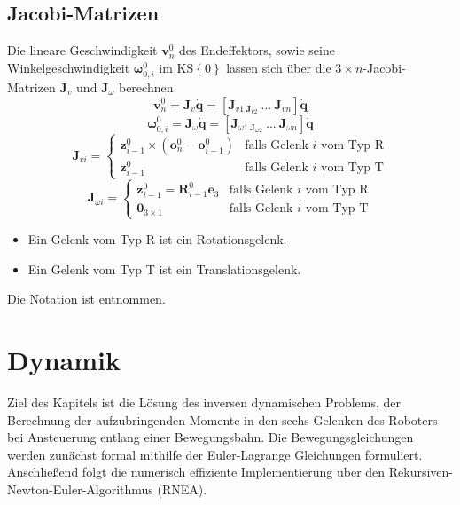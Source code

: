 \subsection{Jacobi-Matrizen}
Die lineare Geschwindigkeit $\bm{v}^0_n$ des Endeffektors, sowie seine Winkelgeschwindigkeit $\bm{\omega}^0_{0,i}$ im  KS$\left\{0\right\}$ lassen sich über die $3\times n$-Jacobi-Matrizen $\bm{J}_v$ und $\bm{J}_{\omega}$ berechnen. 
%
\begin{equation}
	\bm{v}^0_n = \bm{J}_v \dot{\bm{q}} = \left[\bm{J}_{v1 \ \bm{J}_{v2}} \ ...\  \bm{J}_{vn}\right] \dot{\bm{q}}
\end{equation}
%
\begin{equation}
	\bm{\omega}^0_{0,i} = \bm{J}_{\omega} \dot{\bm{q}}  = \left[\bm{J}_{\omega1 \ \bm{J}_{\omega2}} \ ...\  \bm{J}_{\omega n}\right] \dot{\bm{q}}
\end{equation}
%
\begin{equation}
	\bm{J}_{vi} = \begin{cases} 
		\bm{z}^0_{i-1} \times (\bm{o}^0_{n} - \bm{o}^0_{i-1}) & \text{falls Gelenk } i \text{ vom Typ } \text{R} \\
		\bm{z}^0_{i-1} & \text{falls Gelenk } i \text{ vom Typ } \text{T}
	\end{cases}
\end{equation}
%
\begin{equation}
	\bm{J}_{\omega i} = \begin{cases} 
		\bm{z}^0_{i-1} = \bm{R}^0_{i-1}\bm{e}_3 & \text{falls Gelenk } i \text{ vom Typ } \text{R} \\
		\mathbf{0}_{3 \times 1} & \text{falls Gelenk } i \text{ vom Typ } \text{T}
	\end{cases}
\end{equation}
%
\begin{itemize}
	\item Ein Gelenk vom Typ R ist ein Rotationsgelenk.
	\item Ein Gelenk vom Typ T ist ein Translationsgelenk.
\end{itemize}
%
Die Notation ist \autocite{Rieber.2022} entnommen.
%
%
\section{Dynamik}
Ziel des Kapitels ist die Lösung des inversen dynamischen Problems, der Berechnung der aufzubringenden Momente in den sechs Gelenken des Roboters bei Ansteuerung entlang einer Bewegungsbahn. \autocite[S.~247]{Grimble.2009} 
Die Bewegungsgleichungen werden zunächst formal mithilfe der Euler-Lagrange Gleichungen formuliert. Anschließend folgt die numerisch effiziente Implementierung  über den Rekursiven-Newton-Euler-Algorithmus (RNEA).  \autocite[S.~247]{Grimble.2009} 
%
